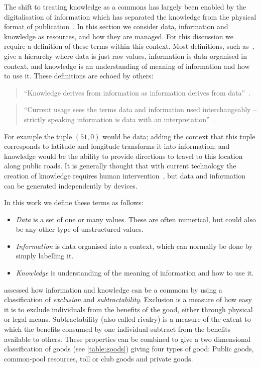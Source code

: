 The shift to treating knowledge as a commons has largely been enabled by the digitalisation of information which has separated the knowledge from the physical format of publication~\citep{Ostrom2003}. 
In this section we consider data, information and knowledge as resources, and how they are managed. 
For this discussion we require a definition of these terms within this context.
Most definitions, such as~\citet{Machlup1983}, give a hierarchy where data is just raw values, information is data organised in context, and knowledge is an understanding of meaning of information and how to use it. These definitions are echoed by others:

\begin{quote}
``Knowledge derives from information as information derives from data''~\citep[p.6]{Davenport2000}.
\end{quote}
\begin{quote}
``Current usage sees the terms data and information used interchangeably -- strictly speaking information is
data with an interpretation''~\citep[p.203]{Shadbolt2013}.
\end{quote}

For example the tuple $(51,0)$ would be data; adding the context that this tuple corresponds to latitude and longitude transforms it into information; and knowledge would be the ability to provide directions to travel to this location along public roads. It is generally thought that with current technology the creation of knowledge requires human intervention~\citep{Davenport2000}, but data and information can be generated independently by devices. 

In this work we define these terms as follows:
\begin{itemize}
\item \emph{Data} is a set of one or many values. These are often numerical, but could also be any other type of unstructured values.
\item \emph{Information} is data organised into a context, which can normally be done by simply labelling it.
\item \emph{Knowledge} is understanding of the meaning of information and how to use it.
\end{itemize}

\citet{Ostrom2003} assessed how information and knowledge can be a commons by using a classification of \emph{exclusion} and \emph{subtractability}. 
Exclusion is a measure of how easy it is to exclude individuals from the benefits of the good, either through physical or legal means. 
Subtractability (also called rivalry) is a measure of the extent to which the benefits consumed by one individual subtract from the benefits available to others. 
These properties can be combined to give a two dimensional classification of goods (see \autoref{table:goods}) giving four types of good: Public goods, common-pool resources, toll or club goods and private goods.


